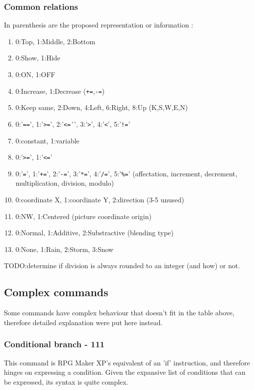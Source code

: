 \documentclass[11pt]{article}
\begin{document}
{\newpage
\subsubsection*{Common relations}

In parenthesis are the proposed representation or information :
\begin{enumerate}
	\item 0:Top, 1:Middle, 2:Bottom
	\item 0:Show, 1:Hide
	\item 0:ON, 1:OFF
	\item 0:Increase, 1:Decrease (\verb|+=|,\verb|-=|)
	\item 0:Keep same, 2:Down, 4:Left, 6:Right, 8:Up (K,S,W,E,N)
	\item 0:'\verb|==|', 1:'\verb|>=|', 2:'\verb|<=|´', 3:'\verb|>|', 4:'\verb|<|', 5:'\verb|!=|'
	\item 0:constant, 1:variable
	\item 0:'\verb|>=|', 1:'\verb|<=|'
	\item 0:'\verb|=|', 1:'\verb|+=|', 2:'\verb|-=|', 3:'\verb|*=|', 4:'\verb|/=|', 5:'\verb|%=|' (affectation, increment, decrement, multiplication, division, modulo)
	\item 0:coordinate X, 1:coordinate Y, 2:direction (3-5 unused)
	\item 0:NW, 1:Centered (picture coordinate origin)
	\item 0:Normal, 1:Additive, 2:Substractive (blending type)
	
	\item 0:None, 1:Rain, 2:Storm, 3:Snow
\end{enumerate}

TODO:determine if division is always rounded to an integer (and how) or not.


\subsection*{Complex commands}

Some commands have complex behaviour that doesn't fit in the table above, therefore detailed explanation were put here instead.


\subsubsection*{Conditional branch - 111}
\label{sec:condbranch}

This command is RPG Maker XP's equivalent of an 'if' instruction, and therefore hinges on expressing a condition. Given the expansive list of conditions that can be expressed, its syntax is quite complex.

}
\end{document}
